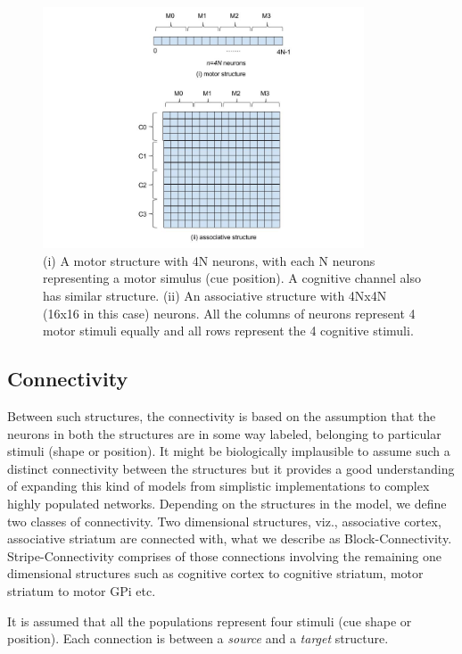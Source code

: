 \documentclass[11pt]{article}
\begin{document}
\begin{figure}[h]
\begin{center}
\includegraphics[width=0.85\textwidth]{Associative.jpg}
\caption[Structures]{(i) A motor structure with 4N neurons, with each N neurons representing a motor simulus (cue position). A cognitive channel also has similar structure. (ii) An associative structure with 4Nx4N (16x16 in this case) neurons. All the columns of neurons represent 4 motor stimuli equally and all rows represent the 4 cognitive stimuli.}
\end{center}
\end{figure}

\subsection{Connectivity}
Between such structures, the connectivity is based on the assumption that the neurons in both the structures are in some way labeled, belonging to particular stimuli (shape or position). It might be biologically implausible to assume such a distinct connectivity between the structures but it provides a good understanding of expanding this kind of models from simplistic implementations to complex highly populated networks. Depending on the structures in the model, we define two classes of connectivity. Two dimensional structures, viz., associative cortex, associative striatum are connected with, what we describe as Block-Connectivity. Stripe-Connectivity comprises of those connections involving the remaining one dimensional structures such as cognitive cortex to cognitive striatum, motor striatum to motor GPi etc.  

It is assumed that all the populations represent four stimuli (cue shape or position). Each connection
is between a \emph{source} and a \emph{target} structure.
\par
\end{document}
